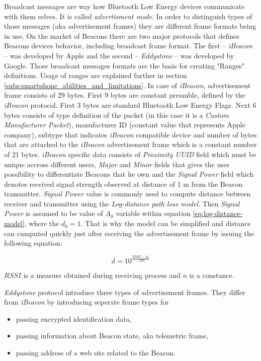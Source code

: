 \documentclass[../main.tex]{subfiles}
\begin{document}
Broadcast messages are way how Bluetooth Low Energy devices communicate with them selves. It is called \textit{advertisment mode}. In order to distinguish types of those messages (aka advertisement frames) they are different frame formats being in use. On the market of Beacons there are two major protocols that defines Beacons devices behavior, including broadcast frame format. The first -- \textit{iBeacon} -- was developed by Apple and the second -- \textit{Eddystone} -- was developed by Google. Those broadcast messages formats are the basis for creating "Ranges" definitions. Usage of ranges are explained further in section \ref{subs:smartphone_abilities_and_limitations}. In case of \textit{iBeacon}, advertisement frame consists of 29 bytes. First 9 bytes are constant preamble, defined by the \textit{iBeacon} protocol. First 3 bytes are standard Bluetooth Low Energy Flags. Next 6 bytes consists of type definition of the packet (in this case it is a \textit{Custom Manufacturer Packet}),  manufacturer ID (constant value that represents Apple company), subtype that indicates \textit{iBeacon} compatible device and number of bytes that are attached to the \textit{iBeacon} advertisement frame which is a constant number of 21 bytes.  \textit{iBeacon} specific data consists of \textit{Proximity UUID} field which must be unique accross different users, \textit{Major} and \textit{Minor} fields that gives the user possibility to differentiate Beacons that he own and the \textit{Signal Power} field which denotes received signal strength observed at distance of 1 m from the Beacon transmitter. \textit{Signal Power} value is commonly used to compute distance between receiver and transmitter using the \textit{Log-distance path loss model}. Then \textit{Signal Power} is assumed to be value of $A_0$ variable within equation \ref{eq:log-distance-model}, where the $d_0 = 1$. That is why the model can be simplified and distance can cumputed quickly just after receiving the advertisement frame by issuing the following equation:

\begin{equation}
	d = 10^{\frac{RSSI-A_0}{-10n}}
\end{equation}

$RSSI$ is a measure obtained during receiving process and $n$ is a constance.

\textit{Eddystone} protocol introduce three types of advertisement frames. They differ from \textit{iBeacon} by introducing seperate frame types for
\begin{itemize}
	\item passing encrypted identification data,
	\item passing information about Beacon state, aka telemetric frame,
	\item passing address of a web site related to the Beacon.
\end{itemize}
\end{document}

